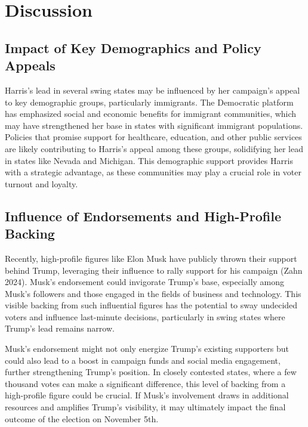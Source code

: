 \documentclass[
  letterpaper,
  DIV=11,
  numbers=noendperiod]{scrartcl}
\begin{document}
\hypertarget{discussion}{%
\section{Discussion}\label{discussion}}

\hypertarget{impact-of-key-demographics-and-policy-appeals}{%
\subsection{Impact of Key Demographics and Policy
Appeals}\label{impact-of-key-demographics-and-policy-appeals}}

Harris's lead in several swing states may be influenced by her
campaign's appeal to key demographic groups, particularly immigrants.
The Democratic platform has emphasized social and economic benefits for
immigrant communities, which may have strengthened her base in states
with significant immigrant populations. Policies that promise support
for healthcare, education, and other public services are likely
contributing to Harris's appeal among these groups, solidifying her lead
in states like Nevada and Michigan. This demographic support provides
Harris with a strategic advantage, as these communities may play a
crucial role in voter turnout and loyalty.

\hypertarget{influence-of-endorsements-and-high-profile-backing}{%
\subsection{Influence of Endorsements and High-Profile
Backing}\label{influence-of-endorsements-and-high-profile-backing}}

Recently, high-profile figures like Elon Musk have publicly thrown their
support behind Trump, leveraging their influence to rally support for
his campaign (Zahn 2024). Musk's endorsement could invigorate Trump's
base, especially among Musk's followers and those engaged in the fields
of business and technology. This visible backing from such influential
figures has the potential to sway undecided voters and influence
last-minute decisions, particularly in swing states where Trump's lead
remains narrow.

Musk's endorsement might not only energize Trump's existing supporters
but could also lead to a boost in campaign funds and social media
engagement, further strengthening Trump's position. In closely contested
states, where a few thousand votes can make a significant difference,
this level of backing from a high-profile figure could be crucial. If
Musk's involvement draws in additional resources and amplifies Trump's
visibility, it may ultimately impact the final outcome of the election
on November 5th.
\end{document}

